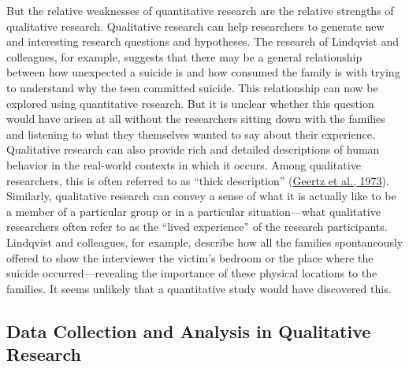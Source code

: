 \documentclass[
]{krantz}
\begin{document}
But the relative weaknesses of quantitative research are the relative strengths of qualitative research. Qualitative research can help researchers to generate new and interesting research questions and hypotheses. The research of Lindqvist and colleagues, for example, suggests that there may be a general relationship between how unexpected a suicide is and how consumed the family is with trying to understand why the teen committed suicide. This relationship can now be explored using quantitative research. But it is unclear whether this question would have arisen at all without the researchers sitting down with the families and listening to what they themselves wanted to say about their experience. Qualitative research can also provide rich and detailed descriptions of human behavior in the real-world contexts in which it occurs. Among qualitative researchers, this is often referred to as ``thick description'' (\protect\hyperlink{ref-geertz1973interpretation}{Geertz et al., 1973}). Similarly, qualitative research can convey a sense of what it is actually like to be a member of a particular group or in a particular situation---what qualitative researchers often refer to as the ``lived experience'' of the research participants. Lindqvist and colleagues, for example, describe how all the families spontaneously offered to show the interviewer the victim's bedroom or the place where the suicide occurred---revealing the importance of these physical locations to the families. It seems unlikely that a quantitative study would have discovered this.

\hypertarget{data-collection-and-analysis-in-qualitative-research}{%
\subsection*{Data Collection and Analysis in Qualitative Research}\label{data-collection-and-analysis-in-qualitative-research}}
\end{document}
